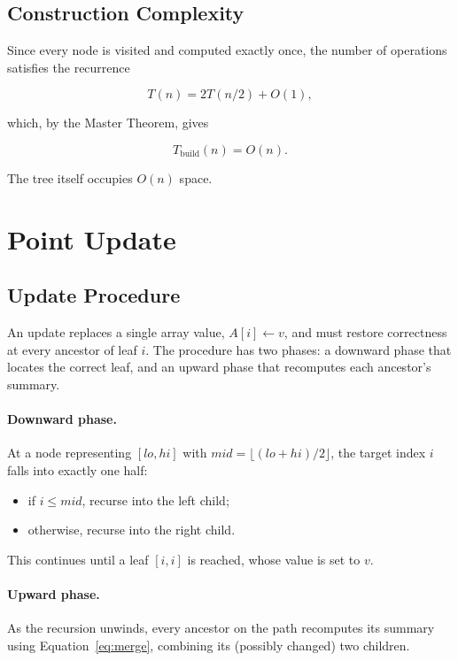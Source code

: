 \documentclass[11pt]{scrartcl}
\begin{document}
\subsection{Construction Complexity}
Since every node is visited and computed exactly once, the number of operations satisfies the recurrence

\begin{equation}
T(n) = 2T(n/2) + O(1),
\end{equation}

which, by the Master Theorem, gives

\begin{equation}
\boxed{T_{\text{build}}(n) = O(n)}.
\end{equation}

The tree itself occupies $O(n)$ space.

\section{Point Update}

\subsection{Update Procedure}
An update replaces a single array value, $A[i] \leftarrow v$, and must restore correctness at every ancestor of leaf $i$. The procedure has two phases: a downward phase that locates the correct leaf, and an upward phase that recomputes each ancestor's summary.

\paragraph{Downward phase.} At a node representing $[lo, hi]$ with $mid = \lfloor (lo+hi)/2 \rfloor$, the target index $i$ falls into exactly one half:
\begin{itemize}[nosep]
  \item if $i \le mid$, recurse into the left child;
  \item otherwise, recurse into the right child.
\end{itemize}
This continues until a leaf $[i,i]$ is reached, whose value is set to $v$.

\paragraph{Upward phase.} As the recursion unwinds, every ancestor on the path recomputes its summary using Equation~\eqref{eq:merge}, combining its (possibly changed) two children.
\end{document}
